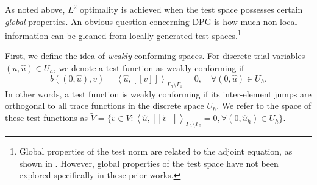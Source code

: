 \documentclass[11pt,onecolumn]{scrartcl}
\newcommand{\LRp}[1]{\left( #1 \right)}
\newcommand{\LRs}[1]{\left[ #1 \right]}
\newcommand{\LRa}[1]{\left\langle #1 \right\rangle}
\newcommand{\jump}[1] {\ensuremath{\LRs{\!\left[#1\right]\!}}}
\newcommand{\uh}{\widehat{u}}
\newcommand{\Gh}{\Gamma_h}
\begin{document}
As noted above, $L^2$ optimality is achieved when the test space possesses certain \textit{global} properties.  An obvious question concerning DPG is how much non-local information can be gleaned from locally generated test spaces.\footnote{Global properties of the test norm are related to the adjoint equation, as shown in \cite{DPGrobustness, ChanHeuerBui-ThanhDemkowicz12}.  However, global properties of the test space have not been explored specifically in these prior works.}

First, we define the idea of \textit{weakly} conforming spaces.  For discrete trial variables $\LRp{u,\uh} \in U_h$, we denote a test function as weakly conforming if
\[
b\LRp{\LRp{0,\uh},v} = \LRa{\uh,\jump{v}}_{\Gh\setminus \Gamma_0} = 0, \quad \forall \LRp{0,\uh} \in U_h.
\]
In other words, a test function is weakly conforming if its inter-element jumps are orthogonal to all trace functions in the discrete space $U_h$.  We refer to the space of these test functions as $\tilde{V} = \{\tilde{v}\in V: \LRa{\uh,\jump{\tilde{v}}}_{\Gh\setminus\Gamma_0} = 0, \forall \LRp{0,\uh_h}\in U_h\}$.
\end{document}
